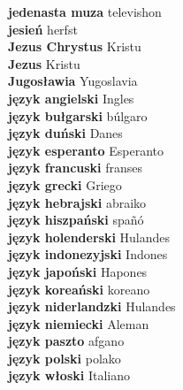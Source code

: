 \textbf{ jedenasta muza  } televishon \\
\textbf{ jesień  } herfst \\
\textbf{ Jezus Chrystus  } Kristu \\
\textbf{ Jezus  } Kristu \\
\textbf{ Jugosławia  } Yugoslavia \\
\textbf{ język angielski  } Ingles \\
\textbf{ język bułgarski  } búlgaro \\
\textbf{ język duński  } Danes \\
\textbf{ język esperanto  } Esperanto \\
\textbf{ język francuski  } franses \\
\textbf{ język grecki  } Griego \\
\textbf{ język hebrajski  } abraiko \\
\textbf{ język hiszpański  } spañó \\
\textbf{ język holenderski  } Hulandes \\
\textbf{ język indonezyjski  } Indones \\
\textbf{ język japoński  } Hapones \\
\textbf{ język koreański  } koreano \\
\textbf{ język niderlandzki  } Hulandes \\
\textbf{ język niemiecki  } Aleman \\
\textbf{ język paszto  } afgano \\
\textbf{ język polski  } polako \\
\textbf{ język włoski  } Italiano \\
